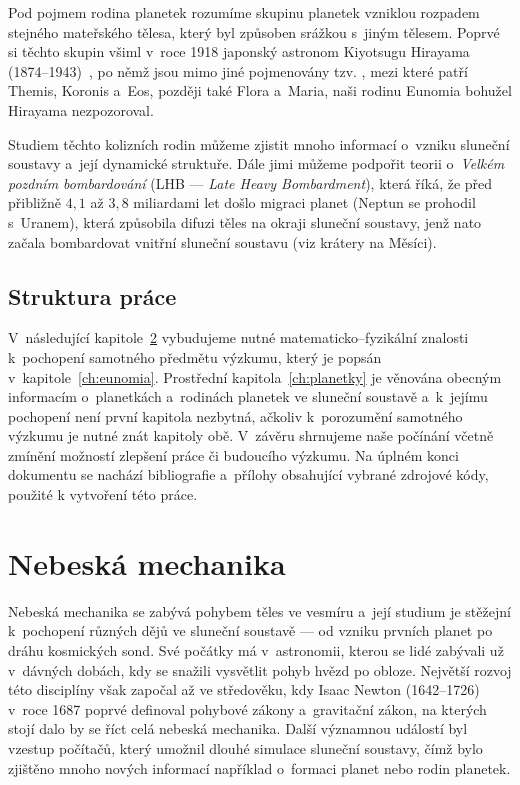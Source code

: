 \documentclass[A4paper, 12pt, oneside]{book}
\begin{document}
Pod pojmem rodina planetek rozumíme skupinu planetek vzniklou rozpadem stejného mateřského tělesa, který byl způsoben srážkou s~jiným tělesem. Poprvé si těchto skupin všiml v~roce 1918 japonský astronom Kiyotsugu Hirayama (1874--1943)~\cite{wiki:hirayama}, po němž jsou mimo jiné pojmenovány tzv. , mezi které patří Themis, Koronis a~Eos, později také Flora a~Maria, naši rodinu Eunomia bohužel Hirayama nezpozoroval. 

Studiem těchto kolizních rodin můžeme zjistit mnoho informací o~vzniku sluneční soustavy a~její dynamické struktuře. Dále jimi můžeme podpořit teorii o~\textit{Velkém pozdním bombardování} (LHB --- \textit{Late Heavy Bombardment}), která říká, že před přibližně $4,1$ až $3,8$ miliardami let došlo migraci planet (Neptun se prohodil s~Uranem), která způsobila difuzi těles na okraji sluneční soustavy, jenž nato začala bombardovat vnitřní sluneční soustavu (viz krátery na Měsíci).

\section{Struktura práce}
V~následující kapitole~\ref{ch:celmech} vybudujeme nutné matematicko--fyzikální znalosti k~pochopení samotného předmětu výzkumu, který je popsán v~kapitole~\ref{ch:eunomia}. Prostřední kapitola~\ref{ch:planetky} je věnována obecným informacím o~planetkách a~rodinách planetek ve sluneční soustavě a~k~jejímu pochopení není první kapitola nezbytná, ačkoliv k~porozumění samotného výzkumu je nutné znát kapitoly obě. V~závěru shrnujeme naše počínání včetně zmínění možností zlepšení práce či budoucího výzkumu. Na úplném konci dokumentu se nachází bibliografie a~přílohy obsahující vybrané zdrojové kódy, použité k vytvoření této práce.

\chapter{Nebeská mechanika} \label{ch:celmech}
Nebeská mechanika se zabývá pohybem těles ve vesmíru a~její studium je stěžejní k~pochopení různých dějů ve sluneční soustavě --- od vzniku prvních planet po dráhu kosmických sond. Své počátky má v~astronomii, kterou se lidé zabývali už v~dávných dobách, kdy se snažili vysvětlit pohyb hvězd po obloze. Největší rozvoj této disciplíny však započal až ve středověku, kdy Isaac Newton (1642--1726) v~roce 1687 poprvé definoval pohybové zákony a~gravitační zákon, na kterých stojí dalo by se říct celá nebeská mechanika. Další významnou událostí byl vzestup počítačů, který umožnil dlouhé simulace sluneční soustavy, čímž bylo zjištěno mnoho nových informací například o~formaci planet nebo rodin planetek.
\end{document}
